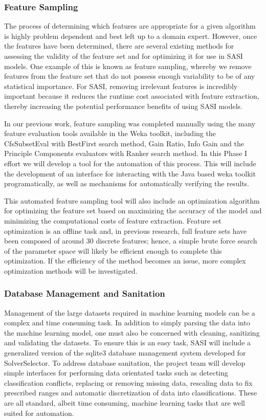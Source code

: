 \subsubsection{Feature Sampling}  The process of determining which features are appropriate for a given algorithm is highly problem dependent and best left up to a domain expert. However, once the features have been determined, there are several existing methods for assessing the validity of the feature set and for optimizing it for use in SASI models. One example of this is known as feature sampling, whereby we remove features from the feature set that do not possess enough variability to be of any statistical importance. For SASI, removing irrelevant features is incredibly important because it reduces the runtime cost associated with feature extraction, thereby increasing the potential performance benefits of using SASI models. 

In our previous work, feature sampling was completed manually using the many feature evaluation tools available in the Weka toolkit, including the CfsSubsetEval with BestFirst search method, Gain Ratio, Info Gain and the Principle Components evaluators with Ranker search method. In this Phase I effort we will develop a tool for the automation of this process. This will include the development of an interface for interacting with the Java based weka toolkit programatically, as well as mechanisms for automatically verifying the results. 

This automated feature sampling tool will also include an optimization algorithm for optimizing the feature set based on maximizing the accuracy of the model and minimizing the computational costs of feature extraction. Feature set optimization is an offline task and, in previous research, full feature sets have been composed of around 30 discrete features; hence, a simple brute force search of the parameter space will likely be efficient enough to complete this optimization. If the efficiency of the method becomes an issue, more complex optimization methods will be investigated. 
  
\subsubsection{Database Management and Sanitation} Management of the large datasets required in machine learning models can be a complex and time consuming task. In addition to simply parsing the data into the machine learning model, one must also be concerned with cleaning, sanitizing and validating the datasets. To ensure this is an easy task, SASI will include a generalized version of the sqlite3 database management system developed for SolverSelector. To address database sanitation, the project team will develop simple interfaces for performing data orientated tasks such as detecting classification conflicts, replacing or removing missing data, rescaling data to fix prescribed ranges and automatic discretization of data into classifications. These are all standard, albeit time consuming, machine learning tasks that are well suited for automation. 


